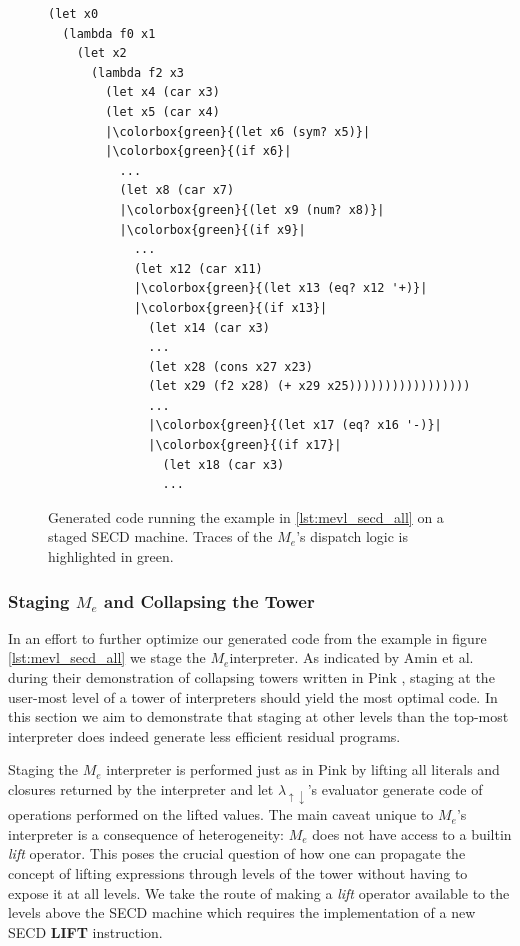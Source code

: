 \documentclass[a4paper,12pt,twoside,openright]{report}
\theoremstyle{definition}
\newcommand{\mslang}{$\lambda_{\uparrow\downarrow}$}
\newcommand{\mevl}{$M_{e}$}
\begin{document}
\begin{figure}[htp!]
\centering
    \begin{verbatim}
(let x0
  (lambda f0 x1
    (let x2
      (lambda f2 x3
        (let x4 (car x3)
        (let x5 (car x4)
        |\colorbox{green}{(let x6 (sym? x5)}|
        |\colorbox{green}{(if x6}|
          ...
          (let x8 (car x7)
          |\colorbox{green}{(let x9 (num? x8)}|
          |\colorbox{green}{(if x9}|
            ...
            (let x12 (car x11)
            |\colorbox{green}{(let x13 (eq? x12 '+)}|
            |\colorbox{green}{(if x13}|
              (let x14 (car x3)
              ...
              (let x28 (cons x27 x23)
              (let x29 (f2 x28) (+ x29 x25)))))))))))))))))
              ...
              |\colorbox{green}{(let x17 (eq? x16 '-)}|
              |\colorbox{green}{(if x17}|
                (let x18 (car x3)
                ...
    \end{verbatim}
\caption{Generated code running the example in \ref{lst:mevl_secd_all} on a staged SECD machine. Traces of the \mevl's dispatch logic is highlighted in green.}
\label{lst:mevl_secd_ped}
\end{figure}
\pagebreak

\subsubsection{Staging \texorpdfstring{\mevl}{Lg} and Collapsing the Tower}
In an effort to further optimize our generated code from the example in figure \ref{lst:mevl_secd_all} we stage the \mevl interpreter. As indicated by Amin et al. during their demonstration of collapsing towers written in Pink \cite{amin2017collapsing}, staging at the user-most level of a tower of interpreters should yield the most optimal code. In this section we aim to demonstrate that staging at other levels than the top-most interpreter does indeed generate less efficient residual programs.

Staging the \mevl{} interpreter is performed just as in Pink \cite{amin2017collapsing} by lifting all literals and closures returned by the interpreter and let \mslang's evaluator generate code of operations performed on the lifted values. The main caveat unique to \mevl's interpreter is a consequence of heterogeneity: \mevl{} does not have access to a builtin \textit{lift} operator. This poses the crucial question of how one can propagate the concept of lifting expressions through levels of the tower without having to expose it at all levels. We take the route of making a \textit{lift} operator available to the levels above the SECD machine which requires the implementation of a new SECD \textbf{LIFT} instruction.
\end{document}
